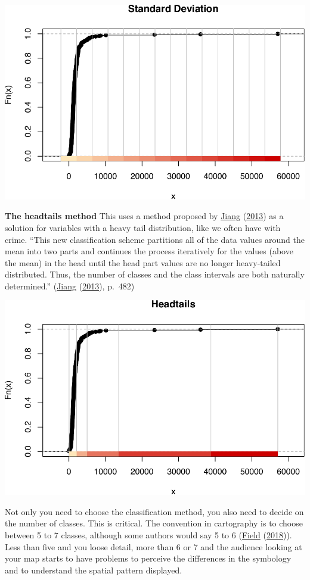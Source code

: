 \documentclass[
  krantz2]{krantz}
\begin{document}
\includegraphics{crime_mapping_files/figure-latex/unnamed-chunk-93-1.pdf}

\textbf{The headtails method} This uses a method proposed by \protect\hyperlink{ref-Jiang_2013}{Jiang} (\protect\hyperlink{ref-Jiang_2013}{2013}) as a solution for variables with a heavy tail distribution, like we often have with crime. ``This new classification scheme partitions all of the data values around the mean into two parts and continues the process iteratively for the values (above the mean) in the head until the head part values are no longer heavy-tailed distributed. Thus, the number of classes and the class intervals are both naturally determined.'' (\protect\hyperlink{ref-Jiang_2013}{Jiang} (\protect\hyperlink{ref-Jiang_2013}{2013}), p.~482)

\includegraphics{crime_mapping_files/figure-latex/unnamed-chunk-94-1.pdf}

Not only you need to choose the classification method, you also need to decide on the number of classes. This is critical. The convention in cartography is to choose between 5 to 7 classes, although some authors would say 5 to 6 (\protect\hyperlink{ref-Field_2018}{Field} (\protect\hyperlink{ref-Field_2018}{2018})). Less than five and you loose detail, more than 6 or 7 and the audience looking at your map starts to have problems to perceive the differences in the symbology and to understand the spatial pattern displayed.
\end{document}
